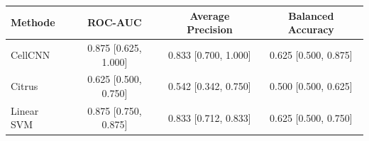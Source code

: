 \begin{tabular*}{\linewidth}{@{\extracolsep{\fill}}lccc@{}}
\toprule
Methode & ROC-AUC & Average Precision & Balanced Accuracy \\
\midrule
\textcolor{cellcnn}{CellCNN} & 0.875 [0.625, 1.000] & 0.833 [0.700, 1.000] & 0.625 [0.500, 0.875] \\
\textcolor{citrus}{Citrus} & 0.625 [0.500, 0.750] & 0.542 [0.342, 0.750] & 0.500 [0.500, 0.625] \\
\textcolor{svm}{Linear SVM} & 0.875 [0.750, 0.875] & 0.833 [0.712, 0.833] & 0.625 [0.500, 0.750] \\
\bottomrule
\end{tabular*}
